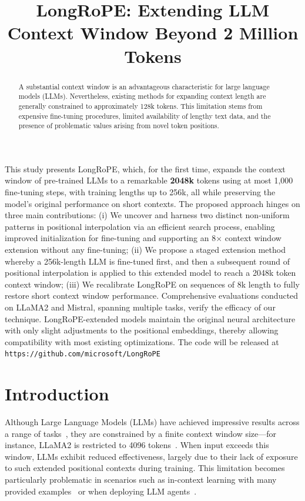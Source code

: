 \title{LongRoPE: Extending LLM Context Window Beyond 2 Million Tokens}

\begin{abstract}
A substantial context window is an advantageous characteristic for large language models (LLMs). Nevertheless, existing methods for expanding context length are generally constrained to approximately 128k tokens. This limitation stems from expensive fine-tuning procedures, limited availability of lengthy text data, and the presence of problematic values arising from novel token positions.
\end{abstract}

This study presents LongRoPE, which, for the first time, expands the context window of pre-trained LLMs to a remarkable \textbf{2048k} tokens using at most 1,000 fine-tuning steps, with training lengths up to 256k, all while preserving the model's original performance on short contexts. The proposed approach hinges on three main contributions: (i) We uncover and harness two distinct non-uniform patterns in positional interpolation via an efficient search process, enabling improved initialization for fine-tuning and supporting an 8$\times$ context window extension without any fine-tuning; (ii) We propose a staged extension method whereby a 256k-length LLM is fine-tuned first, and then a subsequent round of positional interpolation is applied to this extended model to reach a 2048k token context window; (iii) We recalibrate LongRoPE on sequences of 8k length to fully restore short context window performance. Comprehensive evaluations conducted on LLaMA2 and Mistral, spanning multiple tasks, verify the efficacy of our technique. LongRoPE-extended models maintain the original neural architecture with only slight adjustments to the positional embeddings, thereby allowing compatibility with most existing optimizations. The code will be released at \texttt{https://github.com/microsoft/LongRoPE}

\section{Introduction}

Although Large Language Models (LLMs) have achieved impressive results across a range of tasks~\cite{gpt4,llama2}, they are constrained by a finite context window size—for instance, LLaMA2 is restricted to 4096 tokens~\cite{llama2}. When input exceeds this window, LLMs exhibit reduced effectiveness, largely due to their lack of exposure to such extended positional contexts during training. This limitation becomes particularly problematic in scenarios such as in-context learning with many provided examples~\cite{Huang2023FewerIM} or when deploying LLM agents~\cite{park2023generative,madaan2023selfrefine}.

